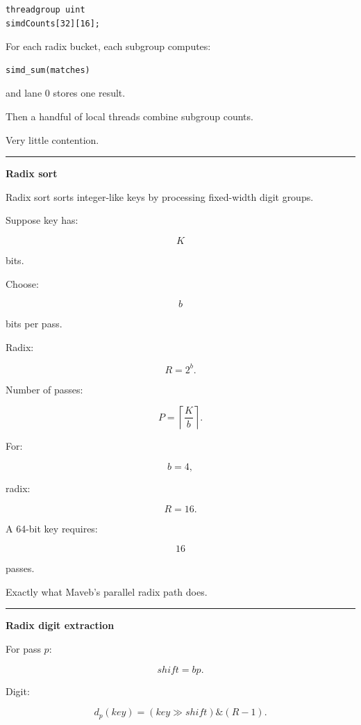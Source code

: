 \protect{}\label{ctu20l}%
\begin{verbatim}
threadgroup uint
simdCounts[32][16];
\end{verbatim}

For each radix bucket, each subgroup computes:

\protect{}\label{6uv2yi}%
\begin{verbatim}
simd_sum(matches)
\end{verbatim}

and lane 0 stores one result.

Then a handful of local threads combine subgroup counts.

Very little contention.

\begin{center}\rule{0.5\linewidth}{0.5pt}\end{center}

\textbf{Radix sort}

Radix sort sorts integer-like keys by processing fixed-width digit groups.

Suppose key has:

\[
K
\]

bits.

Choose:

\[
b
\]

bits per pass.

Radix:

\[
R=2^b.
\]

Number of passes:

\[
\boxed{
P=
\left\lceil
\frac Kb
\right\rceil.
}
\]

For:

\[
b=4,
\]

radix:

\[
R=16.
\]

A 64-bit key requires:

\[
16
\]

passes.

Exactly what Maveb's parallel radix path does.

\begin{center}\rule{0.5\linewidth}{0.5pt}\end{center}

\textbf{Radix digit extraction}

For pass \(p\):

\[
shift=bp.
\]

Digit:

\[
\boxed{
d_p(key)
=
(key\gg shift)
\&
(R-1).
}
\]

